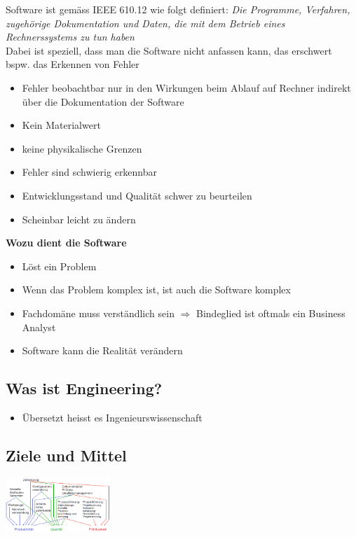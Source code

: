 \documentclass{report}
\newenvironment{Figure}
	{\par\medskip\noindent\minipage{\linewidth}}
	{\endminipage\par\medskip}
\theoremstyle{definition}
\theoremstyle{example}
\begin{document}
Software ist gemäss IEEE 610.12 wie folgt definiert: \textit{Die Programme, Verfahren, 
zugehörige Dokumentation und Daten, die mit dem Betrieb eines Rechnerssystems zu tun haben}\\
Dabei ist speziell, dass man die Software nicht anfassen kann, das erschwert bspw. das Erkennen von Fehler 

\begin{itemize}
   \item Fehler beobachtbar nur
   \subitem in den Wirkungen beim Ablauf auf Rechner
   \subitem indirekt über die Dokumentation der Software 
   \item Kein Materialwert
   \item keine physikalische Grenzen
   \item Fehler sind schwierig erkennbar
   \item Entwicklungsstand und Qualität schwer zu beurteilen
   \item Scheinbar leicht zu ändern
\end{itemize}

\textbf{Wozu dient die Software}
\begin{itemize}
   \item Löst ein Problem
   \item Wenn das Problem komplex ist, ist auch die Software komplex
   \item Fachdomäne muss verständlich sein $\Rightarrow$ Bindeglied ist oftmals ein Business Analyst
   \item Software kann die Realität verändern
\end{itemize}

\subsection{Was ist Engineering?}
\begin{itemize}
   \item Übersetzt heisst es Ingenieurswissenschaft 
\end{itemize}

\subsection{Ziele und Mittel}
\begin{Figure}
   \centering
    \includegraphics[width=150px]{img/ZieleMittel.png}
        \label{fig:Ziele und Mittel der SE}
    \end{Figure}
\end{document}
